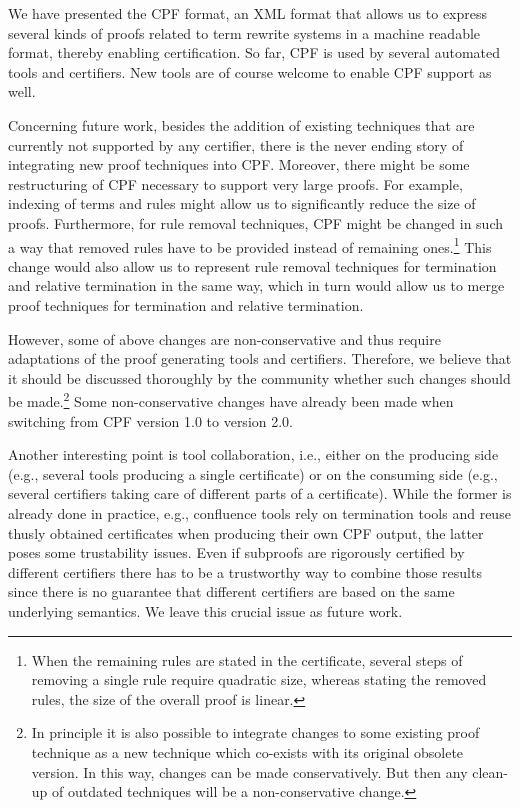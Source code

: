 \documentclass[USenglish]{eptcs}
\begin{document}
We have presented the CPF format, an XML format that allows us to express
several kinds of proofs related to term rewrite systems in a machine readable
format, thereby enabling certification.  So far, CPF is used by several
automated tools and certifiers. New tools are of course welcome to enable CPF
support as well.

Concerning future work, besides the addition of existing techniques that are
currently not supported by any certifier, there is the never ending story of
integrating new proof techniques into CPF.
Moreover, there might be some restructuring of CPF necessary to support very
large proofs. For example, indexing of terms and rules might allow us to
significantly reduce the size of proofs.
Furthermore, for rule removal techniques, CPF might be changed in such a way
that removed rules have to be provided instead of remaining
ones.\footnote{When the remaining rules are stated in the certificate, several
steps of removing a single rule require quadratic size, whereas stating the
removed rules, the size of the overall proof is linear.}
This change would also allow us to represent rule removal techniques for
termination and relative termination in the same way, which in turn would allow
us to merge proof techniques for termination and relative termination. 

However, some of above changes are non-conservative and thus require adaptations
of the proof generating tools and certifiers. Therefore, we believe that it
should be discussed thoroughly by the community whether such changes should be
made.\footnote{In principle it is also possible to integrate changes to some
existing proof technique as a new technique which co-exists with its original
obsolete version. In this way, changes can be made conservatively. But then any
clean-up of outdated techniques will be a non-conservative change.} Some
non-conservative changes have already been made when switching from CPF version
1.0 to version 2.0. 

Another interesting point is tool collaboration, i.e., either on the producing
side (e.g., several tools producing a single certificate) or on the consuming
side (e.g., several certifiers taking care of different parts of a certificate).
While the former is already done in practice, e.g., confluence tools rely on
termination tools and reuse thusly obtained certificates when producing their
own CPF output, the latter poses some trustability issues. Even if subproofs are
rigorously certified by different certifiers there has to be a trustworthy way
to combine those results since there is no guarantee that different certifiers
are based on the same underlying semantics. We leave this crucial issue as
future work.




\end{document}
